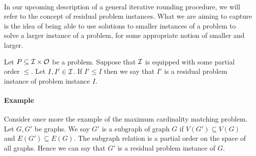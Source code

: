 \paragraph{}
In our upcoming description of a general iterative rounding procedure, we will refer to the concept of residual problem instances. What we are aiming to capture is the idea of being able to use solutions to smaller instances of a problem to solve a larger instance of a problem, for some appropriate notion of smaller and larger.
\begin{definition}
Let $P \subseteq \mathcal{I} \times \mathcal{O}$ be a problem. Suppose that $\mathcal{I}$ is equipped with some partial order $\leq$. Let $I, I' \in \mathcal{I}$. If $I' \leq I$ then we say that $I'$ is a residual problem instance of problem instance $I$.
\end{definition}
\paragraph{Example}
Consider once more the example of the maximum cardinality matching problem. Let $G, G'$ be graphs. We say $G'$ is a subgraph of graph $G$ if $V(G') \subseteq V(G)$ and $E(G') \subseteq E(G)$. The subgraph relation is a partial order on the space of all graphs. Hence we can say that $G'$ is a residual problem instance of $G$.

